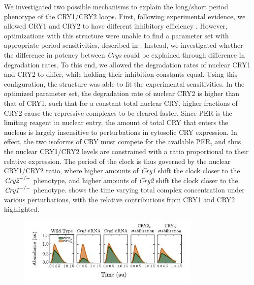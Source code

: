 We investigated two possible mechanisms to explain the long/short period phenotype of the CRY1/CRY2 loops. 
First, following experimental evidence, we allowed CRY1 and CRY2 to have different inhibitory efficiency \cite{GriffinJr.1999}. 
However, optimizations with this structure were unable to find a parameter set with appropriate period sensitivities, described in . 
Instead, we investigated whether the difference in potency between {\it Crys} could be explained through difference in degradation rates. 
To this end, we allowed the degradation rates of nuclear CRY1 and CRY2 to differ, while holding their inhibition constants equal. 
Using this configuration, the structure was able to fit the experimental sensitivities. 
In the optimized parameter set, the degradation rate of nuclear CRY2 is higher than that of CRY1, such that for a constant total nuclear CRY, higher fractions of CRY2 cause the repressive complexes to be cleared faster. 
Since PER is the limiting reagent in nuclear entry, the amount of total CRY that enters the nucleus is largely insensitive to perturbations in cytosolic CRY expression. 
In effect, the two isoforms of CRY must compete for the available PER, and thus the nuclear CRY1/CRY2 levels are constrained with a ratio proportional to their relative expression. 
The period of the clock is thus governed by the nuclear CRY1/CRY2 ratio, where higher amounts of {\it Cry1} shift the clock closer to the $\text{\it Cry2}^{-/-}$ phenotype, and higher amounts of {\it Cry2} shift the clock closer to the $\text{\it Cry1}^{-/-}$ phenotype. 
 shows the time varying total complex concentration under various perturbations, with the relative contributions from CRY1 and CRY2 highlighted.

\begin{figure}[bt]
  \centering
  \includegraphics[width=0.8\textwidth]{chap2/figures/nucleartimecourse.pdf}
  \label{fig:nucleartimecourse}
\end{figure}

